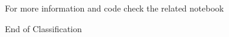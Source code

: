 \documentclass[serif, aspectratio=169]{beamer}
\begin{document}
\begin{frame}
    \begin{center}
        {\Huge\ \color{red}For more information and code check the related notebook}
    \end{center}
\end{frame}


\begin{frame}
    \begin{center}
        {\Huge\ End of Classification}
    \end{center}
\end{frame}
\end{document}
